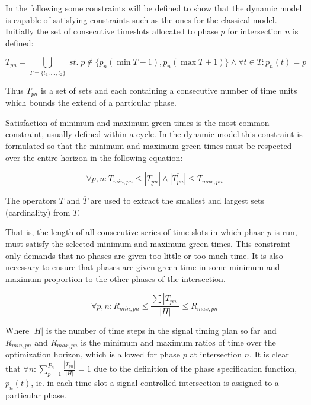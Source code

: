In the following some constraints will be defined to show that the dynamic model is capable of satisfying constraints such as the ones for the classical model. Initially the set of consecutive timeslots allocated to phase $p$ for intersection $n$ is defined:

\begin{equation}
T_{pn} = \bigcup_{T = \lbrace t_1,...,t_2 \rbrace} \; st. \; p \not \in \lbrace p_n(\min T - 1), p_n(\max T + 1) \rbrace \wedge\forall t \in T: p_n(t) = p 
\end{equation}

Thus $T_{pn}$ is a set of sets and each containing a consecutive number of time units which bounds the extend of a particular phase.

Satisfaction of minimum and maximum green times is the most common
constraint, usually defined within a cycle. In the dynamic model this
constraint is formulated so that the minimum and maximum green times
must be respected over the entire horizon in the following equation:

\begin{equation}
\label{eqn:minmaxtimes}
\forall p,n : T_{min,pn} \leq |\underline{T_{pn}}| \wedge |\overline{T_{pn}}| \leq T_{max,pn} 
\end{equation}

The operators $\underline{T}$ and $\overline{T}$ are used to extract the smallest and largest sets (cardinality) from $T$.

That is, the length of all consecutive series of time slots in which
phase $p$ is run, must satisfy the selected minimum and maximum green
times. This constraint only demands that no phases are given too
little or too much time. It is also necessary to ensure that phases
are given green time in some minimum and maximum proportion to the
other phases of the intersection.

\begin{equation}
\label{eqn:proportions}
\forall p,n : R_{min,pn} \leq \frac{\sum |T_{pn}|}{|H|} \leq R_{max,pn}
\end{equation}

Where $|H|$ is the number of time steps in the signal timing plan so
far and $R_{min,pn}$ and $R_{max,pn}$ is the minimum and maximum
ratios of time over the optimization horizon, which is allowed for
phase $p$ at intersection $n$. It is clear that $\forall n :
\displaystyle\sum_{p=1}^{P_n}\frac{|T_{pn}|}{|H|} = 1$ due to the
definition of the phase specification function, $p_n(t)$, ie. in each
time slot a signal controlled intersection is assigned to a particular
phase.

